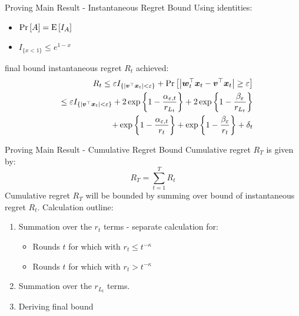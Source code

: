 \documentclass{beamer}
\begin{document}
\begin{frame}{Proving Main Result - Instantaneous Regret Bound}
Using identities:\newline
\begin{itemize}
\item ${\rm Pr}\left[{A}\right]={\rm E}\left[{I_A}\right]$
\item $I_{\{x<1\}}\leq e^{1-x}$\newline
\end{itemize}
final bound instantaneous regret $R_t$ achieved:
\begin{eqnarray}
&&R_t\leq\varepsilon I_{\{\left|{{\boldsymbol{v}}}^{\top}{\boldsymbol{x}}_{t}\right|<\varepsilon\}}+ {\rm Pr}\left[{\left|{{\boldsymbol{w}}}^{\top}_{t}{\boldsymbol{x}}_{t}-{{\boldsymbol{v}}}^{\top}{\boldsymbol{x}}_{t}\right|\geq\varepsilon}\right]\\
&&\leq\varepsilon I_{\{\left|{{\boldsymbol{v}}}^{\top}{\boldsymbol{x}}_{t}\right|<\varepsilon\}}+ 2\exp\left\{1-\frac{\alpha_{\varepsilon,t}}{r_{L_t}}\right\}+2\exp\left\{1-\frac{\beta_{\varepsilon}}{r_{L_t}}\right\}\nonumber\\
&&+\exp\left\{1-\frac{\alpha_{\varepsilon,t}}{r_t}\right\}+\exp\left\{1-\frac{\beta_{\varepsilon}}{r_t}\right\}+\delta_t\nonumber
\label{exponent_regret_class}
\end{eqnarray}
\end{frame}



\begin{frame}{Proving Main Result - Cumulative Regret Bound}
Cumulative regret $R_T$ is given by:
\begin{equation}
R_T=\sum\limits_{t=1}^{T}R_t
\label{cum_reg_define}
\end{equation}
Cumulative regret $R_T$ will be bounded by summing over bound of instantaneous regret $R_t$. \newline\newline Calculation outline:\newline
\begin{enumerate}
\item Summation over the $r_t$ terms - separate calculation for:
\begin{itemize}
\item Rounds $t$ for which with $r_t\leq t^{-\kappa}$
\item Rounds $t$ for which with $r_t> t^{-\kappa}$
\end{itemize}
\item Summation over the $r_{L_t}$ terms.
\item Deriving final bound
\end{enumerate}
\end{frame}
\end{document}
